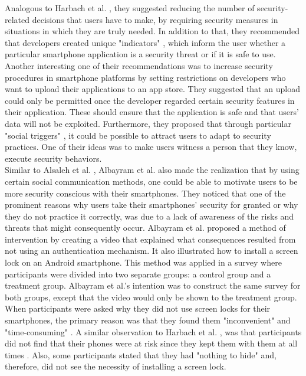 Analogous to Harbach et al. \cite{harbach}, they suggested reducing the number of security-related decisions that users have to make, by requiring security measures in situations in which they are truly needed. In addition to that, they recommended that developers created unique "indicators" \cite{Alsaleh}, which inform the user whether a particular smartphone application is a security threat or if it is safe to use. Another interesting one of their recommendations was to increase security procedures in smartphone platforms by setting restrictions on developers who want to upload their applications to an app store. They suggested that an upload could only be permitted once the developer regarded certain security features in their application.  These should ensure that the application is safe and that users' data will not be exploited. Furthermore, they proposed that through particular "social triggers" \cite{Alsaleh}, it could be possible to attract users to adapt to security practices. One of their ideas was to make users witness a person that they know, execute security behaviors. \\

Similar to Alsaleh et al. \cite{Alsaleh}, Albayram et al. \cite{Albayram:2017:BUL:3235924.3235929} also made the realization that by using certain social communication methods, one could be able to motivate users to be more security conscious with their smartphones. They noticed that one of the prominent reasons why users take their smartphones' security for granted or why they do not practice it correctly, was due to a lack of awareness of the risks and threats that might consequently occur. Albayram et al. \cite{Albayram:2017:BUL:3235924.3235929} proposed a method of intervention by creating a video that explained what consequences resulted from not using an authentication mechanism. It also illustrated how to install a screen lock on an Android smartphone. This method was applied in a survey where participants were divided into two separate groups: a control group and a treatment group. Albayram et al.'s \cite{Albayram:2017:BUL:3235924.3235929} intention was to construct the same survey for both groups, except that the video would only be shown to the treatment group. When participants were asked why they did not use screen locks for their smartphones, the primary reason was that they found them "inconvenient" and "time-consuming" \cite{Albayram:2017:BUL:3235924.3235929}. A similar observation to Harbach et al. \cite{harbach}, was that participants did not find that their phones were at risk since they kept them with them at all times \cite{Albayram:2017:BUL:3235924.3235929}. Also, some participants stated that they had "nothing to hide" and, therefore, did not see the necessity of installing a screen lock.\\

